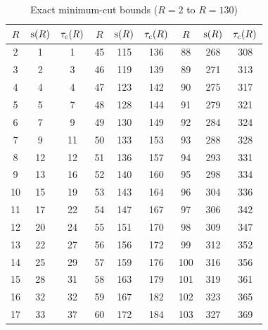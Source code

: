 \begin{table}[H]
	\centering
	\caption{Exact minimum-cut bounds ($R=2$ to $R=130$)}
	\small
	\begin{tabular}{ccc|ccc|ccc}
		\toprule
		$R$ & $\mathrm{s}(R)$ & $\tau_{\mathrm{c}}(R)$ & $R$ & $\mathrm{s}(R)$ & $\tau_{\mathrm{c}}(R)$ & $R$ & $\mathrm{s}(R)$ & $\tau_{\mathrm{c}}(R)$ \\
		\midrule
		2   & 1          & 1            & 45  & 115        & 136          & 88  & 268        & 308          \\
		3   & 2          & 3            & 46  & 119        & 139          & 89  & 271        & 313          \\
		4   & 4          & 4            & 47  & 123        & 142          & 90  & 275        & 317          \\
		5   & 5          & 7            & 48  & 128        & 144          & 91  & 279        & 321          \\
		6   & 7          & 9            & 49  & 130        & 149          & 92  & 284        & 324          \\
		7   & 9          & 11           & 50  & 133        & 153          & 93  & 288        & 328          \\
		8   & 12         & 12           & 51  & 136        & 157          & 94  & 293        & 331          \\
		9   & 13         & 16           & 52  & 140        & 160          & 95  & 298        & 334          \\
		10  & 15         & 19           & 53  & 143        & 164          & 96  & 304        & 336          \\
		11  & 17         & 22           & 54  & 147        & 167          & 97  & 306        & 342          \\
		12  & 20         & 24           & 55  & 151        & 170          & 98  & 309        & 347          \\
		13  & 22         & 27           & 56  & 156        & 172          & 99  & 312        & 352          \\
		14  & 25         & 29           & 57  & 159        & 176          & 100 & 316        & 356          \\
		15  & 28         & 31           & 58  & 163        & 179          & 101 & 319        & 361          \\
		16  & 32         & 32           & 59  & 167        & 182          & 102 & 323        & 365          \\
		17  & 33         & 37           & 60  & 172        & 184          & 103 & 327        & 369          \\

\end{tabular}
\end{table}
